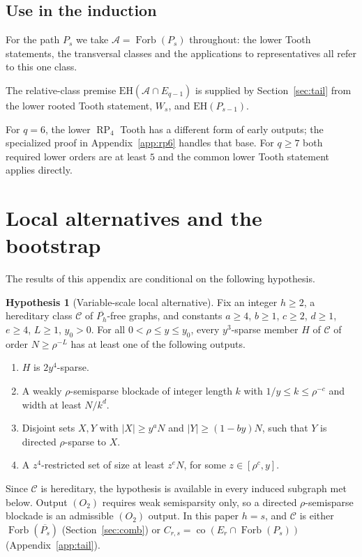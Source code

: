 \documentclass[11pt,a4paper]{article}
\theoremstyle{definition}
\newtheorem{hypothesis}[theorem]{Hypothesis}
\theoremstyle{remark}
\numberwithin{equation}{section}
\DeclareMathOperator{\Forb}{Forb}
\DeclareMathOperator{\co}{co}
\newcommand{\EH}{\mathrm{EH}}
\begin{document}
\subsection{Use in the induction}
For the path \(P_{s}\) we take \(\mathcal A=\Forb(P_{s})\) throughout: the lower Tooth statements, the transversal classes and the applications to representatives all refer to this one class.

The relative-class premise \(\EH(\mathcal A\cap E_{q-1})\) is supplied by Section~\ref{sec:tail} from the lower rooted Tooth statement, \(W_s\), and \(\EH(P_{s-1})\).

For \(q=6\), the lower \(\operatorname{RP}_{4}\) Tooth has a different form of early outputs; the specialized proof in Appendix~\ref{app:rp6} handles that base. For \(q\ge\allowbreak 7\) both required lower orders are at least \(5\) and the common lower Tooth statement applies directly.


\section{Local alternatives and the bootstrap}\label{app:bootstrap}

The results of this appendix are conditional on the following hypothesis.

\begin{hypothesis}[Variable-scale local alternative]\label{hyp:oracle}
Fix an integer \(h\ge2\), a hereditary class \(\mathcal C\) of \(\overline{P_{h}}\)-free graphs, and constants \(a\ge 4\), \(b\ge 1\), \(c\ge 2\), \(d\ge 1\), \(e\ge 4\), \(L\ge 1\), \(y_{0}>0\). For all \(0<\rho\le y\le y_{0}\), every \(y^{3}\)-sparse member \(H\) of \(\mathcal C\) of order \(N\ge \rho^{-L}\) has at least one of the following outputs.
\begin{enumerate}[label=(\(O_{\arabic*}\))]
\item \(H\) is \(2y^{4}\)-sparse.
\item A weakly \(\rho\)-semisparse blockade of integer length \(k\) with \(1/y\le k\le \rho^{-c}\) and width at least \(N/k^{d}\).
\item Disjoint sets \(X,Y\) with \(|X|\ge y^{a} N\) and \(|Y|\ge (1-by)N\), such that \(Y\) is directed \(\rho\)-sparse to \(X\).
\item A \(z^{4}\)-restricted set of size at least \(z^{e} N\), for some \(z\in[\rho^{c},y]\).
\end{enumerate}
\end{hypothesis}
Since \(\mathcal C\) is hereditary, the hypothesis is available in every induced subgraph met below. Output \((O_{2})\) requires weak semisparsity only, so a directed \(\rho\)-semisparse blockade is an admissible \((O_{2})\) output. In this paper \(h=s\), and \(\mathcal C\) is either \(\Forb(\overline{P_s})\) (Section~\ref{sec:comb}) or \(C_{r,s}=\co(E_r\cap\Forb(P_s))\) (Appendix~\ref{app:tail}).
\end{document}
